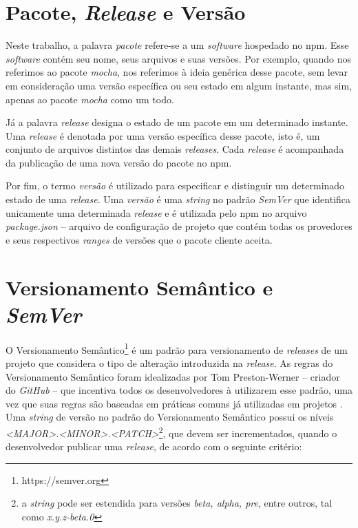 \section{Pacote, \textit{Release} e Versão}
\label{ref-teo:pac_rel_ver}
Neste trabalho, a palavra \textit{pacote} refere-se a um \textit{software} hospedado no \gls{npm}. Esse \textit{software} contém seu nome, seus arquivos e suas versões. Por exemplo, quando nos referimos ao pacote \textit{mocha}, nos referimos à ideia genérica desse pacote, sem levar em consideração uma versão específica ou seu estado em algum instante, mas sim, apenas ao pacote \textit{mocha} como um todo.

Já a palavra \textit{release} designa o estado de um pacote em um determinado instante. Uma \textit{release} é denotada por uma versão específica desse pacote, isto é, um conjunto de arquivos distintos das demais \textit{releases}. Cada \textit{release} é acompanhada da publicação de uma nova versão do pacote no \gls{npm}.

Por fim, o termo \textit{versão} é utilizado para especificar e distinguir um determinado estado de uma \textit{release}. Uma \textit{versão} é uma \textit{string} no padrão \textit{SemVer} que identifica unicamente uma determinada \textit{release} e é utilizada pelo \gls{npm} no arquivo \textit{package.json} -- arquivo de configuração de projeto que contém todas os provedores e seus respectivos \textit{ranges} de versões que o pacote cliente aceita.

\section{Versionamento Semântico e \textit{SemVer}}
\label{ref-teo:semver}
O Versionamento Semântico\footnote{https://semver.org} é um padrão para versionamento de \textit{releases} de um projeto que considera o tipo de alteração introduzida na \textit{release}. As regras do Versionamento Semântico foram idealizadas por Tom Preston-Werner -- criador do \textit{GitHub} -- que incentiva todos os desenvolvedores à utilizarem esse padrão, uma vez que suas regras são baseadas em práticas comuns já utilizadas em projetos \cite{teorical_reference:semver}. Uma \textit{string} de versão no padrão do Versionamento Semântico possui os níveis \textit{<MAJOR>.<MINOR>.<PATCH>}\footnote{a \textit{string} pode ser estendida para versões \textit{beta, alpha, pre}, entre outros, tal como \textit{x.y.z-beta.0}}, que devem ser incrementados, quando o desenvolvedor publicar uma \textit{release}, de acordo com o seguinte critério:

